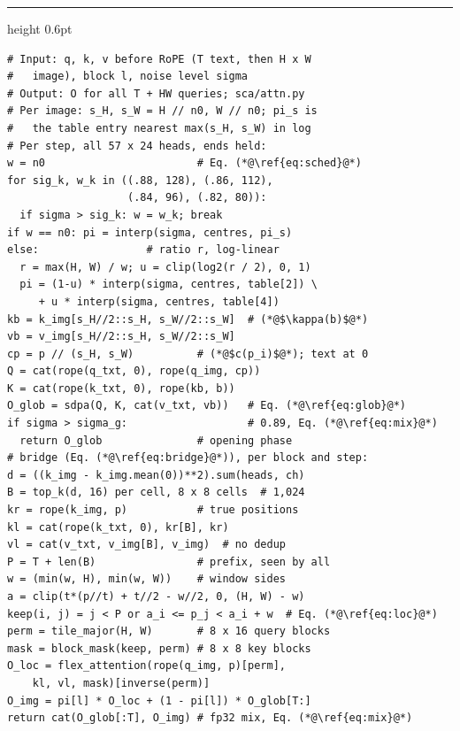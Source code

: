 
\begin{minipage}[t]{0.48\linewidth}
    \hrule height 0.6pt\vspace{2pt}
    \label{alg:sample_full}
    \vspace{-4pt}
\begin{lstlisting}[style=scacode, emph={rope,sdpa,cat,clip,log2,interp,top_k,tile_major,block_mask,flex_attention,inverse}]
# Input: q, k, v before RoPE (T text, then H x W
#   image), block l, noise level sigma
# Output: O for all T + HW queries; sca/attn.py
# Per image: s_H, s_W = H // n0, W // n0; pi_s is
#   the table entry nearest max(s_H, s_W) in log
# Per step, all 57 x 24 heads, ends held:
w = n0                        # Eq. (*@\ref{eq:sched}@*)
for sig_k, w_k in ((.88, 128), (.86, 112),
                   (.84, 96), (.82, 80)):
  if sigma > sig_k: w = w_k; break
if w == n0: pi = interp(sigma, centres, pi_s)
else:                 # ratio r, log-linear
  r = max(H, W) / w; u = clip(log2(r / 2), 0, 1)
  pi = (1-u) * interp(sigma, centres, table[2]) \
     + u * interp(sigma, centres, table[4])
kb = k_img[s_H//2::s_H, s_W//2::s_W]  # (*@$\kappa(b)$@*)
vb = v_img[s_H//2::s_H, s_W//2::s_W]
cp = p // (s_H, s_W)          # (*@$c(p_i)$@*); text at 0
Q = cat(rope(q_txt, 0), rope(q_img, cp))
K = cat(rope(k_txt, 0), rope(kb, b))
O_glob = sdpa(Q, K, cat(v_txt, vb))   # Eq. (*@\ref{eq:glob}@*)
if sigma > sigma_g:                   # 0.89, Eq. (*@\ref{eq:mix}@*)
  return O_glob               # opening phase
# bridge (Eq. (*@\ref{eq:bridge}@*)), per block and step:
d = ((k_img - k_img.mean(0))**2).sum(heads, ch)
B = top_k(d, 16) per cell, 8 x 8 cells  # 1,024
kr = rope(k_img, p)           # true positions
kl = cat(rope(k_txt, 0), kr[B], kr)
vl = cat(v_txt, v_img[B], v_img)  # no dedup
P = T + len(B)                # prefix, seen by all
w = (min(w, H), min(w, W))    # window sides
a = clip(t*(p//t) + t//2 - w//2, 0, (H, W) - w)
keep(i, j) = j < P or a_i <= p_j < a_i + w  # Eq. (*@\ref{eq:loc}@*)
perm = tile_major(H, W)       # 8 x 16 query blocks
mask = block_mask(keep, perm) # 8 x 8 key blocks
O_loc = flex_attention(rope(q_img, p)[perm],
    kl, vl, mask)[inverse(perm)]
O_img = pi[l] * O_loc + (1 - pi[l]) * O_glob[T:]
return cat(O_glob[:T], O_img) # fp32 mix, Eq. (*@\ref{eq:mix}@*)
\end{lstlisting}
\end{minipage}

